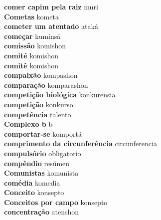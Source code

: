\textbf{ comer capim pela raiz  } muri \\
\textbf{ Cometas  } kometa \\
\textbf{ cometer um atentado  } ataká \\
\textbf{ começar  } kuminsá \\
\textbf{ comissão  } komishon \\
\textbf{ comité  } komishon \\
\textbf{ comitê  } komishon \\
\textbf{ compaixão  } kompashon \\
\textbf{ comparação  } komparashon \\
\textbf{ competição biológica  } konkurensia \\
\textbf{ competição  } konkurso \\
\textbf{ competência  } talento \\
\textbf{ Complexo b  } b \\
\textbf{ comportar-se  } komportá \\
\textbf{ comprimento da circunferência  } circunferencia \\
\textbf{ compulsório  } obligatorio \\
\textbf{ compêndio  } resúmen \\
\textbf{ Comunistas  } komunista \\
\textbf{ comédia  } komedia \\
\textbf{ Conceito  } konsepto \\
\textbf{ Conceitos por campo  } konsepto \\
\textbf{ concentração  } atenshon \\
